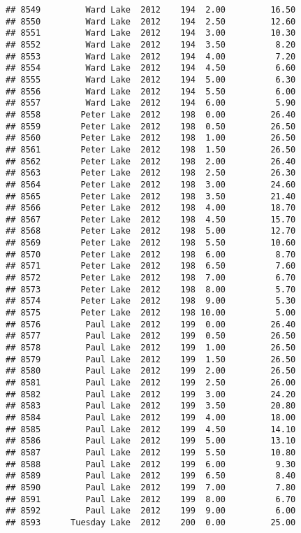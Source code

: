 \documentclass[
]{article}
\begin{document}
\begin{verbatim}
## 8549         Ward Lake  2012    194  2.00         16.50
## 8550         Ward Lake  2012    194  2.50         12.60
## 8551         Ward Lake  2012    194  3.00         10.30
## 8552         Ward Lake  2012    194  3.50          8.20
## 8553         Ward Lake  2012    194  4.00          7.20
## 8554         Ward Lake  2012    194  4.50          6.60
## 8555         Ward Lake  2012    194  5.00          6.30
## 8556         Ward Lake  2012    194  5.50          6.00
## 8557         Ward Lake  2012    194  6.00          5.90
## 8558        Peter Lake  2012    198  0.00         26.40
## 8559        Peter Lake  2012    198  0.50         26.50
## 8560        Peter Lake  2012    198  1.00         26.50
## 8561        Peter Lake  2012    198  1.50         26.50
## 8562        Peter Lake  2012    198  2.00         26.40
## 8563        Peter Lake  2012    198  2.50         26.30
## 8564        Peter Lake  2012    198  3.00         24.60
## 8565        Peter Lake  2012    198  3.50         21.40
## 8566        Peter Lake  2012    198  4.00         18.70
## 8567        Peter Lake  2012    198  4.50         15.70
## 8568        Peter Lake  2012    198  5.00         12.70
## 8569        Peter Lake  2012    198  5.50         10.60
## 8570        Peter Lake  2012    198  6.00          8.70
## 8571        Peter Lake  2012    198  6.50          7.60
## 8572        Peter Lake  2012    198  7.00          6.70
## 8573        Peter Lake  2012    198  8.00          5.70
## 8574        Peter Lake  2012    198  9.00          5.30
## 8575        Peter Lake  2012    198 10.00          5.00
## 8576         Paul Lake  2012    199  0.00         26.40
## 8577         Paul Lake  2012    199  0.50         26.50
## 8578         Paul Lake  2012    199  1.00         26.50
## 8579         Paul Lake  2012    199  1.50         26.50
## 8580         Paul Lake  2012    199  2.00         26.50
## 8581         Paul Lake  2012    199  2.50         26.00
## 8582         Paul Lake  2012    199  3.00         24.20
## 8583         Paul Lake  2012    199  3.50         20.80
## 8584         Paul Lake  2012    199  4.00         18.00
## 8585         Paul Lake  2012    199  4.50         14.10
## 8586         Paul Lake  2012    199  5.00         13.10
## 8587         Paul Lake  2012    199  5.50         10.80
## 8588         Paul Lake  2012    199  6.00          9.30
## 8589         Paul Lake  2012    199  6.50          8.40
## 8590         Paul Lake  2012    199  7.00          7.80
## 8591         Paul Lake  2012    199  8.00          6.70
## 8592         Paul Lake  2012    199  9.00          6.00
## 8593      Tuesday Lake  2012    200  0.00         25.00

\end{verbatim}
\end{document}

